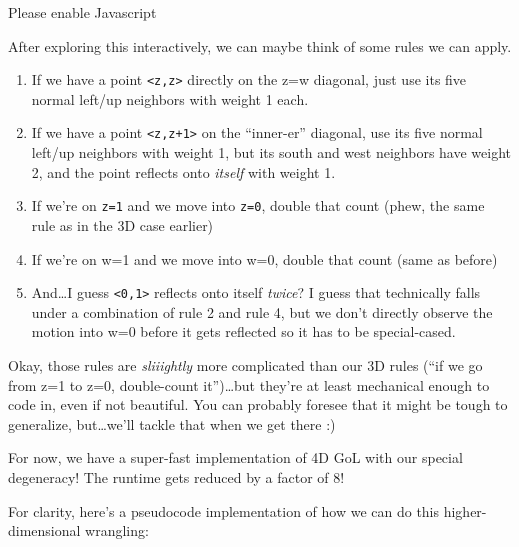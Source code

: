 \documentclass[]{article}
\begin{document}
\leavevmode\hypertarget{golSyms4DReverse}{}%
Please enable Javascript

After exploring this interactively, we can maybe think of some rules we can
apply.

\begin{enumerate}
\def\labelenumi{\arabic{enumi}.}
\tightlist
\item
  If we have a point \texttt{\textless{}z,z\textgreater{}} directly on the z=w
  diagonal, just use its five normal left/up neighbors with weight 1 each.
\item
  If we have a point \texttt{\textless{}z,z+1\textgreater{}} on the ``inner-er''
  diagonal, use its five normal left/up neighbors with weight 1, but its south
  and west neighbors have weight 2, and the point reflects onto \emph{itself}
  with weight 1.
\item
  If we're on \texttt{z=1} and we move into \texttt{z=0}, double that count
  (phew, the same rule as in the 3D case earlier)
\item
  If we're on w=1 and we move into w=0, double that count (same as before)
\item
  And\ldots I guess \texttt{\textless{}0,1\textgreater{}} reflects onto itself
  \emph{twice}? I guess that technically falls under a combination of rule 2 and
  rule 4, but we don't directly observe the motion into w=0 before it gets
  reflected so it has to be special-cased.
\end{enumerate}

Okay, those rules are \emph{sliiightly} more complicated than our 3D rules (``if
we go from z=1 to z=0, double-count it'')\ldots but they're at least mechanical
enough to code in, even if not beautiful. You can probably foresee that it might
be tough to generalize, but\ldots we'll tackle that when we get there :)

For now, we have a super-fast implementation of 4D GoL with our special
degeneracy! The runtime gets reduced by a factor of 8!

For clarity, here's a pseudocode implementation of how we can do this
higher-dimensional wrangling:
\end{document}
